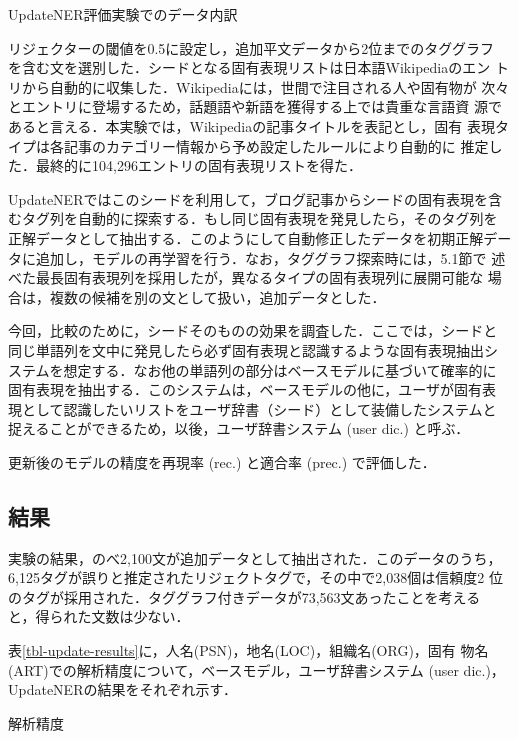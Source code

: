 \documentclass[japanese]{jnlp_1.4}
\begin{document}
\begin{table}[b]
\caption{UpdateNER評価実験でのデータ内訳}
\label{tbl-update-corpus}

\end{table}

リジェクターの閾値を0.5に設定し，追加平文データから2位までのタググラフ
を含む文を選別した．シードとなる固有表現リストは日本語Wikipediaのエン
トリから自動的に収集した．Wikipediaには，世間で注目される人や固有物が
次々とエントリに登場するため，話題語や新語を獲得する上では貴重な言語資
源であると言える．本実験では，Wikipediaの記事タイトルを表記とし，固有
表現タイプは各記事のカテゴリー情報から予め設定したルールにより自動的に
推定した．最終的に104,296エントリの固有表現リストを得た．

UpdateNERではこのシードを利用して，ブログ記事からシードの固有表現を含
むタグ列を自動的に探索する．もし同じ固有表現を発見したら，そのタグ列を
正解データとして抽出する．このようにして自動修正したデータを初期正解デー
タに追加し，モデルの再学習を行う．なお，タググラフ探索時には，5.1節で
述べた最長固有表現列を採用したが，異なるタイプの固有表現列に展開可能な
場合は，複数の候補を別の文として扱い，追加データとした．

今回，比較のために，シードそのものの効果を調査した．ここでは，シードと
同じ単語列を文中に発見したら必ず固有表現と認識するような固有表現抽出シ
ステムを想定する．なお他の単語列の部分はベースモデルに基づいて確率的に
固有表現を抽出する．このシステムは，ベースモデルの他に，ユーザが固有表
現として認識したいリストをユーザ辞書（シード）として装備したシステムと
捉えることができるため，以後，ユーザ辞書システム (user dic.) と呼ぶ．

更新後のモデルの精度を再現率 (rec.) と適合率 (prec.) で評価した．



\subsection{結果}

実験の結果，のべ2,100文が追加データとして抽出された．このデータのうち，
6,125タグが誤りと推定されたリジェクトタグで，その中で2,038個は信頼度2 
位のタグが採用された．タググラフ付きデータが73,563文あったことを考える
と，得られた文数は少ない．

表\ref{tbl-update-results}に，人名(PSN)，地名(LOC)，組織名(ORG)，固有
物名(ART)での解析精度について，ベースモデル，ユーザ辞書システム (user
dic.)，UpdateNERの結果をそれぞれ示す．


\begin{table}[b]
\caption{解析精度}
\label{tbl-update-results}

\end{table}
\end{document}

